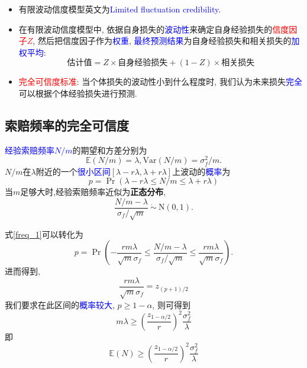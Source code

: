 \documentclass[professionalfont]{beamer}
\def\E{{\mathbb E}}  %
\newcommand{\red}[1]{\textcolor{red}{#1}}
\newcommand{\blue}[1]{\textcolor{blue}{#1}}
\begin{document}
\begin{frame}
\begin{itemize}
\item 有限波动信度模型英文为\blue{Limited fluctuation credibility}.
\item 在有限波动信度模型中, 依据自身损失的\blue{波动性}来确定自身经验损失的\red{信度因子$Z$}, 然后把信度因子作为\blue{权重}, \blue{最终预测结果}为自身经验损失和相关损失的\blue{加权平均}:
\begin{equation}
\text{估计值}=Z\times\text{自身经验损失}+(1-Z)\times\text{相关损失}
\end{equation}
\item \red{完全可信度标准}:
当个体损失的波动性小到什么程度时, 我们认为未来损失\blue{完全}可以根据个体经验损失进行预测.
\end{itemize}
\end{frame}

\subsection{索赔频率的完全可信度}
\begin{frame}
\blue{经验索赔频率$N/m$}的期望和方差分别为\begin{equation}\label{frequency}\E(N/m)=\lambda, \text{Var}(N/m)=\sigma_f^2/{m}.\end{equation} $N/m$在$\lambda$附近的一个\blue{很小区间}$[\lambda-r\lambda, \lambda+r\lambda]$上波动的\blue{概率}为
\begin{equation}\label{freq_1}p=\Pr(\lambda-r\lambda\leq N/m \leq \lambda+r\lambda)\end{equation}
当$m$足够大时,经验索赔频率近似为\textbf{正态分布}, $$\frac{N/m-\lambda}{\sigma_f/\sqrt{m}}~\dot{\sim}~ \text{N}(0,1).$$
\end{frame}

\begin{frame}
式\eqref{freq_1}可以转化为
$$p=\Pr\left(-\frac{rm\lambda}{\sqrt{m}\sigma_f}\leq \frac{N/m-\lambda}{\sigma_f/\sqrt{m}} \leq \frac{rm\lambda}{\sqrt{m}\sigma_f}\right).$$
进而得到,
$$\frac{rm\lambda}{\sqrt{m}\sigma_f}=z_{(p+1)/2}$$
我们要求在此区间的\blue{概率较大}, $p\geq1-\alpha$, 则可得到
\begin{equation}\label{freq}
m\lambda \geq\left(\frac{z_{1-\alpha/2}}{r}\right)^2\frac{\sigma^2_f}{\lambda}
\end{equation}
即
\begin{equation}\E(N)\geq\left(\frac{z_{1-\alpha/2}}{r}\right)^2\frac{\sigma^2_f}{\lambda}
\end{equation}
\end{frame}
\end{document}
